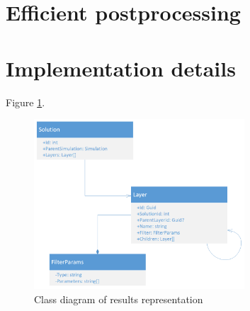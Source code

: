 \section{Efficient postprocessing}
\label{sec:efficient-postprocessing}


\section{Implementation details}
\label{sec:implementation-details}



Figure \ref{fig:results-class-diagram}.

\begin{figure}[H]
    \centering
    \includegraphics[width=0.7\textwidth]{figures/results-class-diagram}
    \decoRule
    \caption{Class diagram of results representation}
    \label{fig:results-class-diagram}
\end{figure}